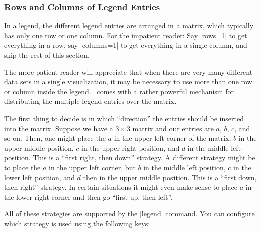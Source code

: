 \subsubsection{Rows and Columns of Legend Entries}

In a legend, the different legend entries are arranged in a matrix,
which typically has only one row or one column. For the impatient
reader: Say |rows=1| to get everything in a row, say |columns=1| to
get everything in a single column, and skip the rest of this section.

The more patient reader will appreciate that when there are very many
different data sets in a single visualization, it may be 
necessary to use more than one row or column inside the legend.
\tikzname\ comes with a rather powerful mechanism for distributing the
multiple legend entries over the matrix. 

The first thing to decide is in which ``direction'' the entries should
be inserted into the matrix. Suppose we have a $3 \times 3$ matrix and
our entries are $a$, $b$, $c$, and so on. Then, one might place the
$a$ in the upper left corner of the matrix, $b$ in the upper middle
position, $c$ in the upper right position, and $d$ in the middle left
position. This is a ``first right, then down'' strategy. A different
strategy might be to place the $a$ in the upper left corner, but $b$
in the middle left position, $c$ in the lower left position, and $d$
then in the upper middle position. This is a ``first down, then
right'' strategy. In certain situations it might even make sense to
place $a$ in the lower right corner and then go ``first up, then
left''.

All of these strategies are supported by the |legend| command. You can
configure which strategy is used using the following keys:



